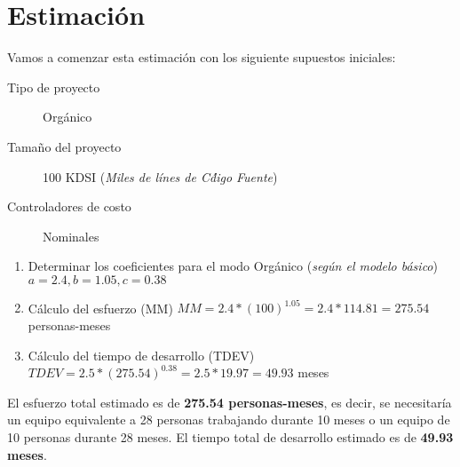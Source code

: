 \section*{Estimaci\'on}
\noindent Vamos a comenzar esta estimaci\'on con los siguiente supuestos iniciales:
\begin{description}
  \item[Tipo de proyecto] Org\'anico
  \item[Tamaño del proyecto] 100 KDSI (\textit{Miles de l\'ines de C\'digo Fuente})
  \item[Controladores de costo] Nominales   
\end{description}

\begin{enumerate}
  \item Determinar los coeficientes para el modo Org\'anico (\textit{seg\'un el modelo b\'asico}) \( a=2.4, b=1.05, c=0.38 \)
  \item C\'alculo del esfuerzo (MM) \( MM = 2.4*(100)^1.05 = 2.4*114.81 = 275.54 \) personas-meses
  \item C\'alculo del tiempo de desarrollo (TDEV) \( TDEV = 2.5*(275.54)^0.38 = 2.5*19.97 = 49.93 \) meses
\end{enumerate}

\noindent El esfuerzo total estimado es de \textbf{275.54 personas-meses}, es decir, se necesitar\'ia un equipo equivalente a 28 personas trabajando durante 10 meses
o un equipo de 10 personas durante 28 meses. El tiempo total de desarrollo estimado es de \textbf{49.93 meses}.
